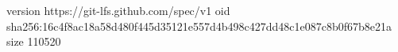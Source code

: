 version https://git-lfs.github.com/spec/v1
oid sha256:16c4f8ac18a58d480f445d35121e557d4b498c427dd48c1e087c8b0f67b8e21a
size 110520

